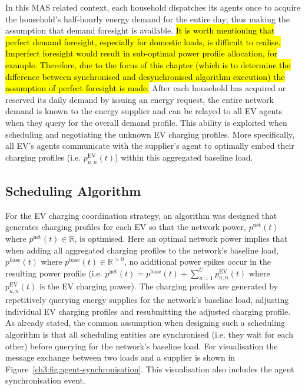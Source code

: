 In this MAS related context, each household dispatches its agents once to acquire the household's half-hourly energy demand for the entire day; thus making the assumption that demand foresight is available.
\hl{It is worth mentioning that perfect demand foresight, especially for domestic loads, is difficult to realise.
Imperfect foresight would result in sub-optimal power profile allocation, for example.
Therefore, due to the focus of this chapter (which is to determine the difference between synchronised and desynchronised algorithm execution) the assumption of perfect foresight is made.}
After each household has acquired or reserved its daily demand by issuing an energy request, the entire network demand is known to the energy supplier and can be relayed to all EV agents when they query for the overall demand profile.
This ability is exploited when scheduling and negotiating the unknown EV charging profiles.
More specifically, all EV's agents communicate with the supplier's agent to optimally embed their charging profiles (i.e. $p^\text{EV}_{u,n}(t)$) within this aggregated baseline load.

\subsection{Scheduling Algorithm}
\label{ch3:subsec:scheduling-algorithm}

For the EV charging coordination strategy, an algorithm was designed that generates charging profiles for each EV so that the network power, $p^\text{net}(t)$ where $p^\text{net}(t) \in \mathbb{R}$, is optimised.
Here an optimal network power implies that when adding all aggregated charging profiles to the network's baseline load, $p^\text{base}(t)$  where $p^\text{base}(t) \in \mathbb{R}^{>0}$, no additional power spikes occur in the resulting power profile (i.e. $p^\text{net}(t) = p^\text{base}(t) + \sum_{u=1}^U p^\text{EV}_{u,n}(t)$ where $p^\text{EV}_{u,n}(t)$ is the EV charging power).
The charging profiles are generated by repetitively querying energy supplies for the network's baseline load, adjusting individual EV charging profiles and resubmitting the adjusted charging profile.
As already stated, the common assumption when designing such a scheduling algorithm is that all scheduling entities are synchronised (i.e. they wait for each other) before querying for the network's baseline load.
For visualisation the message exchange between two loads and a supplier is shown in Figure~\ref{ch3:fig:agent-synchronisation}.
This visualisation also includes the agent synchronisation event.

